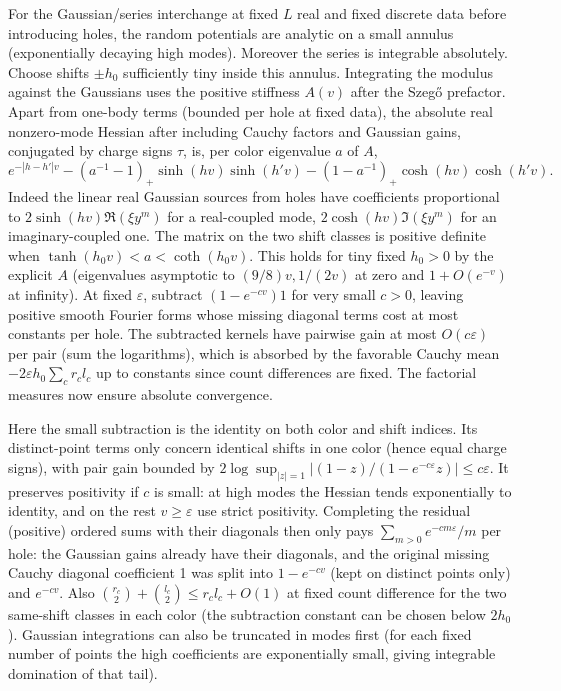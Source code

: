 For the Gaussian/series interchange at fixed \(L\) real and fixed discrete data before introducing holes, the random potentials are analytic on a small annulus (exponentially decaying high modes). Moreover the series is integrable absolutely. Choose shifts \(\pm h_0\) sufficiently tiny inside this annulus. Integrating the modulus against the Gaussians uses the positive stiffness \(A(v)\) after the Szeg\H{o} prefactor. Apart from one-body terms (bounded per hole at fixed data), the absolute real nonzero-mode Hessian after including Cauchy factors and Gaussian gains, conjugated by charge signs \(\tau\), is, per color eigenvalue \(a\) of \(A\),
\[
 e^{-|h-h'|v}-(a^{-1}-1)_+\sinh(hv)\sinh(h'v)
 -(1-a^{-1})_+\cosh(hv)\cosh(h'v).
\]
Indeed the linear real Gaussian sources from holes have coefficients proportional to \(2\sinh(hv)\Re(\xi y^m)\) for a real-coupled mode, \(2\cosh(hv)\Im(\xi y^m)\) for an imaginary-coupled one. The matrix on the two shift classes is positive definite when \(\tanh(h_0v)<a<\coth(h_0v)\). This holds for tiny fixed \(h_0>0\) by the explicit \(A\) (eigenvalues asymptotic to \((9/8)v,1/(2v)\) at zero and \(1+O(e^{-v})\) at infinity). At fixed \(\varepsilon\), subtract \((1-e^{-cv})1\) for very small \(c>0\), leaving positive smooth Fourier forms whose missing diagonal terms cost at most constants per hole. The subtracted kernels have pairwise gain at most \(O(c\varepsilon)\) per pair (sum the logarithms), which is absorbed by the favorable Cauchy mean \(-2\varepsilon h_0\sum_c r_c l_c\) up to constants since count differences are fixed. The factorial measures now ensure absolute convergence.

Here the small subtraction is the identity on both color and shift indices. Its distinct-point terms only concern identical shifts in one color (hence equal charge signs), with pair gain bounded by \(2\log\sup_{|z|=1}|(1-z)/(1-e^{-c\varepsilon}z)|\le c\varepsilon\). It preserves positivity if \(c\) is small: at high modes the Hessian tends exponentially to identity, and on the rest \(v\ge\varepsilon\) use strict positivity. Completing the residual (positive) ordered sums with their diagonals then only pays \(\sum_{m>0}e^{-cm\varepsilon}/m\) per hole: the Gaussian gains already have their diagonals, and the original missing Cauchy diagonal coefficient 1 was split into \(1-e^{-cv}\) (kept on distinct points only) and \(e^{-cv}\). Also \(\binom{r_c}{2}+\binom{l_c}{2}\le r_c l_c+O(1)\) at fixed count difference for the two same-shift classes in each color (the subtraction constant can be chosen below \(2h_0\)). Gaussian integrations can also be truncated in modes first (for each fixed number of points the high coefficients are exponentially small, giving integrable domination of that tail).

